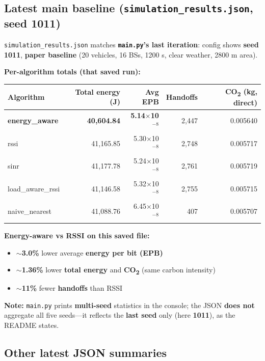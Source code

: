 \documentclass[11pt,a4paper]{article}
\begin{document}
\begin{assistmsg}
\subsection*{Latest main baseline (\texttt{simulation\_results.json}, seed \textbf{1011})}

\texttt{simulation\_results.json} matches \textbf{\texttt{main.py}'s last iteration}: config shows \textbf{seed 1011}, \textbf{paper baseline} (20 vehicles, 16 BSs, 1200 s, clear weather, 2800 m area).

\textbf{Per-algorithm totals (that saved run):}

\begin{center}
\begin{tabular}{@{}lrrrr@{}}
\toprule
\textbf{Algorithm} & \textbf{Total energy (J)} & \textbf{Avg EPB} & \textbf{Handoffs} & \textbf{CO\textsubscript{2} (kg, direct)} \\
\midrule
\textbf{energy\_aware} & \textbf{40,604.84} & \textbf{5.14$\times$10$^{-8}$} & 2,447 & 0.005640 \\
rssi & 41,165.85 & 5.30$\times$10$^{-8}$ & 2,748 & 0.005717 \\
sinr & 41,177.78 & 5.24$\times$10$^{-8}$ & 2,761 & 0.005719 \\
load\_aware\_rssi & 41,146.58 & 5.32$\times$10$^{-8}$ & 2,755 & 0.005715 \\
naive\_nearest & 41,088.76 & 6.45$\times$10$^{-8}$ & 407 & 0.005707 \\
\bottomrule
\end{tabular}
\end{center}

\textbf{Energy-aware vs RSSI on this saved file:}

\begin{itemize}
\item \textbf{$\sim$3.0\%} lower average \textbf{energy per bit (EPB)}
\item \textbf{$\sim$1.36\%} lower \textbf{total energy} and \textbf{CO\textsubscript{2}} (same carbon intensity)
\item \textbf{$\sim$11\%} fewer \textbf{handoffs} than RSSI
\end{itemize}

\textbf{Note:} \texttt{main.py} prints \textbf{multi-seed} statistics in the console; the JSON \textbf{does not} aggregate all five seeds---it reflects the \textbf{last seed} only (here \textbf{1011}), as the README states.

\subsection*{Other latest JSON summaries}


\end{assistmsg}
\end{document}
